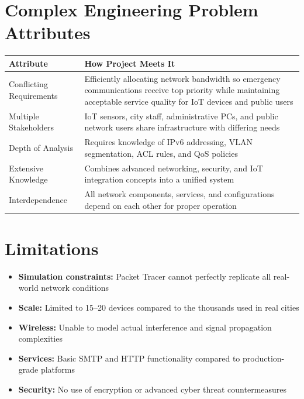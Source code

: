 \documentclass[12pt,a4paper]{article}
\begin{document}
\section*{Complex Engineering Problem Attributes}
{}

\begin{center}
\renewcommand{\arraystretch}{1.2}
\begin{tabularx}{\textwidth}{|p{4.2cm}|X|}
\hline
\textbf{Attribute} & \textbf{How Project Meets It} \\
\hline
Conflicting Requirements & Efficiently allocating network bandwidth so emergency communications receive top priority while maintaining acceptable service quality for IoT devices and public users \\
\hline
Multiple Stakeholders & IoT sensors, city staff, administrative PCs, and public network users share infrastructure with differing needs \\
\hline
Depth of Analysis & Requires knowledge of IPv6 addressing, VLAN segmentation, ACL rules, and QoS policies \\
\hline
Extensive Knowledge & Combines advanced networking, security, and IoT integration concepts into a unified system \\
\hline
Interdependence & All network components, services, and configurations depend on each other for proper operation \\
\hline
\end{tabularx}
\end{center}

\section*{Limitations}
{}
\begin{itemize}[nosep]
    \item \textbf{Simulation constraints:} Packet Tracer cannot perfectly replicate all real-world network conditions
    \item \textbf{Scale:} Limited to 15–20 devices compared to the thousands used in real cities
    \item \textbf{Wireless:} Unable to model actual interference and signal propagation complexities
    \item \textbf{Services:} Basic SMTP and HTTP functionality compared to production-grade platforms
    \item \textbf{Security:} No use of encryption or advanced cyber threat countermeasures
\end{itemize}
\end{document}
